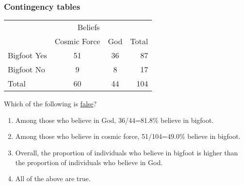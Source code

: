 

\begin{frame}
\frametitle{Contingency tables}
\begin{center}
\begin{tabular}{|l|cc|r|}
      \hline
               &\multicolumn{2}{|c|}{Beliefs} & \\
               &   Cosmic Force & God & Total\\
      \hline
      Bigfoot Yes     &   51   & 36 & 87 \\
      Bigfoot No      &   9    & 8 & 17 \\
       \hline
       Total  &   60  & 44 & 104 \\
       \hline
\end{tabular}
\end{center}
\begin{clicker}{Which of the following is \underline{false}?}
\begin{enumerate}
    \item
    Among those who believe in God, 36/44=81.8\% believe in bigfoot.
    \item
    Among those who believe in cosmic force, 51/104=49.0\% believe in bigfoot.
    \item
    Overall, the proportion of individuals who believe in bigfoot is higher than the proportion of individuals who believe in God.
    \item
    All of the above are true.
\end{enumerate}
\end{clicker}
\end{frame}

